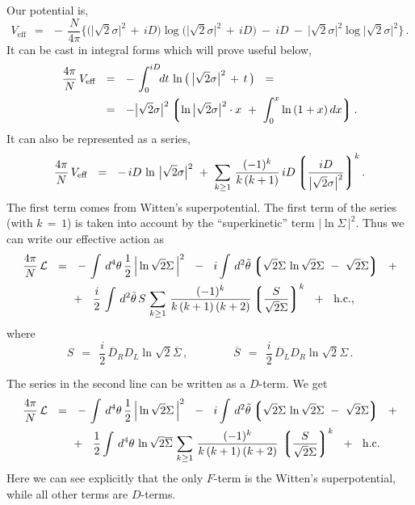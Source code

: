 \documentclass[epsfig,12pt]{article}
\def\beq{\begin{equation}}
\def\eeq{\end{equation}}
\newcommand{\cell}{{\mathcal L}}
\newcommand{\ov}{\overline}
\newcommand{\lgr}{\left\lgroup}
\newcommand{\rgr}{\right\rgroup}
\begin{document}
	Our potential is,
\beq
\label{Veff}
	V_\text{eff}    ~~=~~    -\, \frac{N}{4\pi} 
	\bigg\{
		\big( \big|\sqrt{2}\sigma\big|^2 \,+\, iD \big) 
		\log \big( \big|\sqrt{2}\sigma\big|^2 \,+\, iD \big)
		~-~
		iD
		~-~
		\big|\sqrt{2}\sigma\big|^2 \log \big|\sqrt{2}\sigma\big|^2
	\bigg\}\,.
\eeq
	It can be cast in integral forms which will prove useful below,
\begin{align}
%
\notag
	\frac{4\pi}{N}\, V_\text{eff} &    ~~=~~    -\, \int_0^{iD} \!\!dt\, \ln \big(\, \big|\sqrt{2}\sigma\big|^2 \,+\, t \,\big)
	~~=
	\\
%
	&
	~~=~~    - \big|\sqrt{2}\sigma\big|^2 \lgr \ln \big|\sqrt{2}\sigma\big|^2 \cdot x ~+~
						\int_0^x \ln\, (1 + x)\, dx \rgr.
\end{align}
	It can also be represented as a series,
\beq
\label{Vser}
	 \frac{4\pi}{N}\, V_\text{eff}    ~~=~~
		-\,iD\, \ln\, \big|\sqrt{2}\sigma\big|^2 ~+~
		\sum_{k \geq 1}\, \frac{(-1)^k} 
                                      { k\,(k + 1) }\, iD \lgr \frac{ iD } 
                                                       { \big|\sqrt{2}\sigma\big|^2 } \rgr^k .
\eeq
	The first term comes from Witten's superpotential.
	The first term of the series (with $ k \,=\, 1 $) is taken into account by the
	``superkinetic'' term $ |\ln \Sigma\,|^2 $.
	Thus we can write our effective action as
\begin{align}
%
\notag
	\frac{4\pi}{N}\,\cell &    ~~=~~
			-\,
			\int\, d^4\theta\, \frac{1}{2}\, \Big| \ln \sqrt{2}\Sigma \, \Big|^2
			~~-~~
			i \int\, d^2\tilde\theta 
			\lgr
			\sqrt{2}\Sigma\, \ln \sqrt{2}\Sigma  ~-~ \sqrt{2}\Sigma
			\rgr
			~~+
	\\
%
\label{sseries}
	&
			\phantom{~~=~~}
			+~~
			\frac{i}{2}\, 
			\int\, d^2\tilde\theta\,
			S\,
			\sum_{k \geq 1}\, \frac{    (-1)^k    }
                                           {  k\,(k + 1)\,(k + 2)  } \lgr \frac{S}{\sqrt{2}\Sigma} \rgr^k
			~~+~~ \text{h.c.},
\end{align}
	where
\beq
	S    ~~=~~    \frac{i}{2}\,\ov D{}_R D_L \ln \sqrt{2}\ov\Sigma\,,
	\qquad\qquad
	\ov S    ~~=~~    \frac{i}{2}\, \ov D{}_L D_R \ln \sqrt{2}\Sigma\,.
\eeq

	The series in the second line can be written as a $ D $-term.
	We get
\begin{align}
%
\notag
	\frac{4\pi}{N}\, \cell &    ~~=~~     
			-\,
			\int\, d^4\theta\, \frac{1}{2}\, \Big| \ln \sqrt{2}\Sigma \, \Big|^2
			~~-~~
			i \int\, d^2\tilde\theta 
			\lgr
			\sqrt{2}\Sigma\, \ln \sqrt{2}\Sigma  ~-~ \sqrt{2}\Sigma
			\rgr
			~~+
	\\
%
	&
			\phantom{~~=~~}
			+~~ 
			\frac{1}{2} \int\, d^4\theta\,
			\ln \sqrt{2}\ov\Sigma\,
			\sum_{k \geq 1}\, \frac{    (-1)^k    }
                                           {  k\,(k + 1)\,(k + 2)  }\, \lgr \frac{S}{\sqrt{2}\Sigma} \rgr^k
	~~+~~ \text{h.c.}
\end{align}
	Here we can see explicitly that the only $ F $-term is the Witten's superpotential,
	while all other terms are $ D $-terms.
\end{document}
